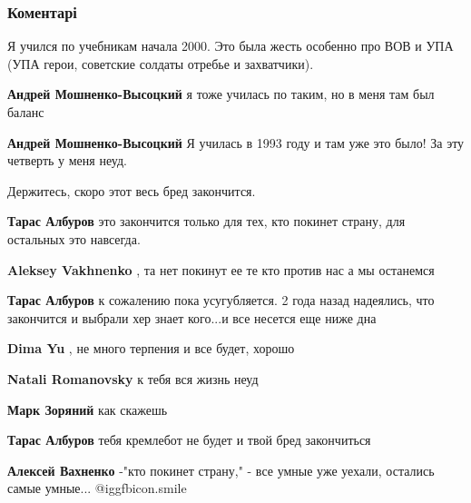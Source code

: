  
 
 
 
 
\subsubsection{Коментарі}
\label{sec:03_10_2021.fb.medvedeva_olesja.1.uchitel_chelovek_podnevolnyj.cmt}

\begin{itemize} %
Я учился по учебникам начала 2000. Это была жесть особенно про ВОВ и УПА (УПА герои, советские солдаты отребье и захватчики).

\begin{itemize} %
\textbf{Андрей Мошненко-Высоцкий} я тоже училась по таким, но в меня там был баланс

\textbf{Андрей Мошненко-Высоцкий} Я училась в 1993 году и там уже это было! За эту четверть у меня неуд.

Держитесь, скоро этот весь бред закончится.

\textbf{Тарас Албуров} это закончится только для тех, кто покинет страну, для остальных это навсегда.

\textbf{Aleksey Vakhnenko} , та нет покинут ее те кто против нас а мы останемся

\textbf{Тарас Албуров} к сожалению пока усугубляется. 2 года назад надеялись, что закончится и выбрали хер знает кого...и все несется еще ниже дна

\textbf{Dima Yu} , не много терпения и все будет, хорошо

\textbf{Natali Romanovsky} к тебя вся жизнь неуд

\textbf{Марк Зоряний} как скажешь

\textbf{Тарас Албуров} тебя кремлебот не будет и твой бред закончиться

\textbf{Алексей Вахненко} -"кто покинет страну,"
- все умные уже уехали, остались самые умные...  @igg{fbicon.smile} 
\end{itemize} %


\end{itemize}
